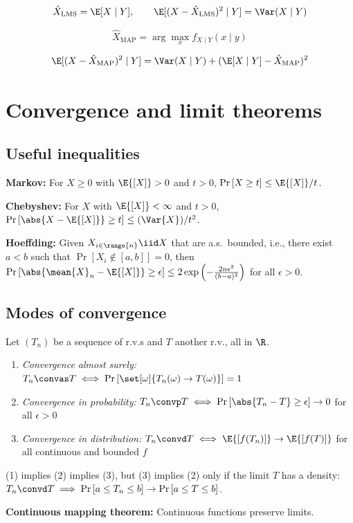 \documentclass[a4paper]{article}
\begin{document}
\[
\hat X_{\mathrm{LMS}}=\E[X\mid Y],\qquad
\E[(X-\hat X_{\mathrm{LMS}})^2\mid Y]=\Var(X\mid Y)
\]

\[
\hat X_{\mathrm{MAP}}=\arg\max_x f_{X\mid Y}(x\mid y)
\]

\[
\E[(X-\hat X_{\mathrm{MAP}})^2\mid Y]
=\Var(X\mid Y)+(\E[X\mid Y]-\hat X_{\mathrm{MAP}})^2
\]
\section{Convergence and limit theorems}
    \subsection{Useful inequalities}
        \textbf{Markov:} For $X \geq 0$ with $\E{[X]} > 0$ and $t > 0$, $\Pr{[X \geq t]} \leq \E{[X]} / t$.

        \textbf{Chebyshev:} For $X$ with $\E{[X]} < \infty$ and $t > 0$, $\Pr{[\abs{X - \E{[X]}} \geq t]} \leq (\Var{X}) / t^2$.

        \textbf{Hoeffding:} Given $X_{i \in \range{n}} \iid X$ that are a.s.\ bounded, i.e., there exist $a < b$ such that $\Pr{[X_i \notin [a, b]]} = 0$, then $\Pr{\left[\abs{\mean{X}_n - \E{[X]}} \geq \epsilon\right]} \leq 2 \exp{\left(-\frac{2 n \epsilon^2}{(b - a)^2}\right)}$ for all $\epsilon > 0$.

    \subsection{Modes of convergence}
        Let $(T_n)$ be a sequence of r.v.s and $T$ another r.v., all in $\R$.
        \begin{enumerate}
            \item \emph{Convergence almost surely:} $T_n \convas T \iff \Pr{\left[\set[\omega]{T_n(\omega) \rightarrow T(\omega)}\right]} = 1$
            \item \emph{Convergence in probability:} $T_n \convp T \iff \Pr{[\abs{T_n - T} \geq \epsilon]} \rightarrow 0$ for all $\epsilon > 0$
            \item \emph{Convergence in distribution:} $T_n \convd T \iff \E{[f(T_n)]} \rightarrow \E{[f(T)]}$ for all continuous and bounded $f$
        \end{enumerate}
        (1) implies (2) implies (3), but (3) implies (2) only if the limit $T$ has a density: $T_n \convd T \implies \Pr{[a \leq T_n \leq b]} \rightarrow \Pr{[a \leq T \leq b]}$.

        \textbf{Continuous mapping theorem:} Continuous functions preserve limits.
\end{document}
